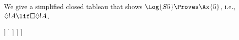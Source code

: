 \documentclass[../../../include/open-logic-section]{subfiles}
\begin{document}
\begin{ex}
  We give a simplified closed tableau that shows $\Log{S5} \Proves
  \Ax{5}$, i.e., $\Diamond!A \lif \Box\Diamond!A$.
  \begin{oltableau}
    [\pFmla{\False}{\Diamond\formula{A} \lif \Box\Diamond \formula{A}}{1},
      just = \TAss
      [\pFmla{\True}{\Diamond \formula{A}}{1}, just = {\TRule{\False}{\lif}[1]}
        [\pFmla{\False}{\Box\Diamond \formula{A}}{1},
          just = {\TRule{\False}{\lif}[1]}
          [\pFmla{\False}{\Diamond \formula{A}}{2},
            just = {\TRule{\False}{\Box}[3]}
            [\pFmla{\True}{\formula{A}}{3},
              just = {\TRule{\True}{\Diamond}[2]}
                [\pFmla{\False}{\formula{A}}{3},
                  just = {\TRule{\False}{\Diamond}[4]}, close]
            ]
          ]
        ]
      ]
    ]
  \end{oltableau}
\end{ex}
\end{document}
